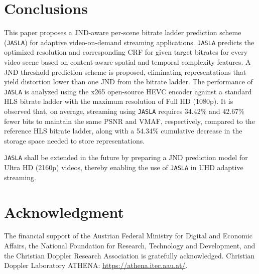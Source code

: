 \documentclass{article}
\newcommand{\jaslad}{\texttt{JASLA}\xspace}
\begin{document}
\section{Conclusions}
\label{sec:conclusion_future_dir}
\vspace{-0.6em}
This paper proposes a JND-aware per-scene bitrate ladder prediction scheme (\jaslad) for adaptive video-on-demand streaming applications. \jaslad predicts the optimized resolution and corresponding CRF for given target bitrates for every video scene based on content-aware spatial and temporal complexity features. A JND threshold prediction scheme is proposed, eliminating representations that yield distortion lower than one JND from the bitrate ladder. The performance of \jaslad is analyzed using the x265 open-source HEVC encoder against a standard HLS bitrate ladder with the maximum resolution of Full HD (1080p). It is observed that, on average, streaming using \jaslad requires 34.42\% and 42.67\% fewer bits to maintain the same PSNR and VMAF, respectively, compared to the reference HLS bitrate ladder, along with a 54.34\% cumulative decrease in the storage space needed to store representations.

\jaslad shall be extended in the future by preparing a JND prediction model for Ultra HD (2160p) videos, thereby enabling the use of \jaslad in UHD adaptive streaming.
\vspace{-0.6em}
\section{Acknowledgment}
\vspace{-0.6em}
The financial support of the Austrian Federal Ministry for Digital and Economic Affairs, the National Foundation for Research, Technology and Development, and the Christian Doppler Research Association is gratefully acknowledged. Christian Doppler Laboratory ATHENA: \url{https://athena.itec.aau.at/}.

\setlength{\parskip}{0pt}
\setlength{\itemsep}{0pt}
 

{\linespread{0.4}\selectfont}
\balance
\end{document}
